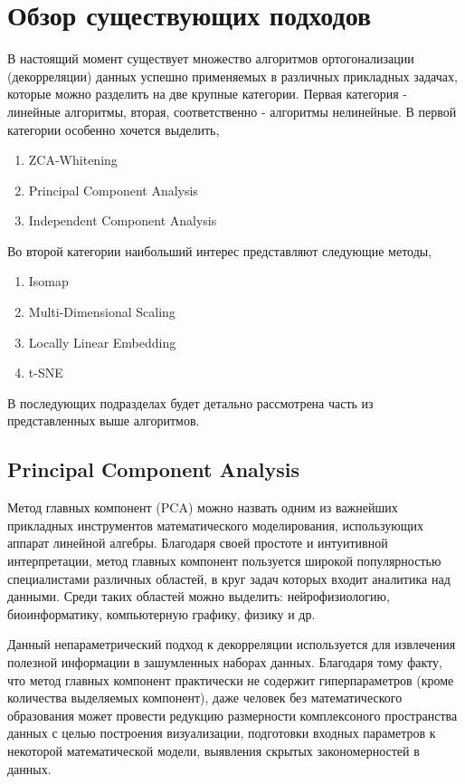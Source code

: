 \documentclass[runningheads]{llncs}
\begin{document}
\section*{Обзор существующих подходов}

В настоящий момент существует множество алгоритмов ортогонализации (декорреляции) данных успешно применяемых в различных прикладных задачах, которые можно разделить на две крупные категории. Первая категория - линейные алгоритмы, вторая, соответственно - алгоритмы нелинейные. В первой категории особенно хочется выделить,
\begin{enumerate}
  \item ZCA-Whitening
  \item Principal Component Analysis
  \item Independent Component Analysis \cite{fastica}
\end{enumerate}
Во второй категории наибольший интерес представляют следующие методы,
\begin{enumerate}
  \item Isomap \cite{isomap}
  \item Multi-Dimensional Scaling \cite{mds}
  \item Locally Linear Embedding \cite{locallyle}
  \item t-SNE  \cite{tsne}
\end{enumerate}
В последующих подразделах будет детально рассмотрена часть из представленных выше алгоритмов.
\subsection{Principal Component Analysis}
\hspace{0.4cm}
Метод главных компонент (PCA) можно назвать одним из важнейших прикладных инструментов математического моделирования, использующих аппарат линейной алгебры. Благодаря своей простоте и интуитивной интерпретации, метод главных компонент пользуется широкой популярностью специалистами различных областей, в круг задач которых входит аналитика над данными. Среди таких областей можно выделить: нейрофизиологию, биоинформатику, компьютерную графику, физику и др. \par
Данный непараметрический подход к декорреляции используется для извлечения полезной информации в зашумленных наборах данных. Благодаря тому факту, что метод главных компонент практически не содержит гиперпараметров (кроме количества выделяемых компонент), даже человек без математического образования может провести редукцию размерности комплексоного пространства данных с целью построения визуализации, подготовки входных параметров к некоторой математической модели, выявления скрытых закономерностей в данных.
\end{document}
